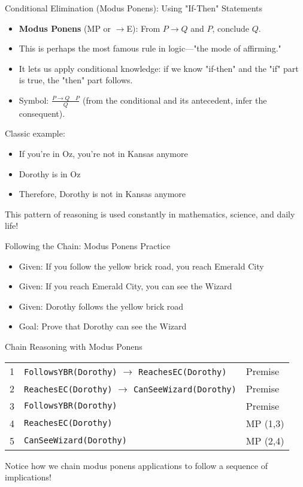 \documentclass{beamer}
\begin{document}
	\begin{frame}{Conditional Elimination (Modus Ponens): Using "If-Then" Statements}
		\begin{itemize}
			\item \textbf{Modus Ponens} (MP or $\rightarrow$E): From $P \rightarrow Q$ and $P$, conclude $Q$.
			\item This is perhaps the most famous rule in logic—"the mode of affirming."
			\item It lets us apply conditional knowledge: if we know "if-then" and the "if" part is true, the "then" part follows.
			\item Symbol: $\frac{P \rightarrow Q \quad P}{Q}$ (from the conditional and its antecedent, infer the consequent).
		\end{itemize}
		
		\begin{example}
			Classic example:
			\begin{itemize}
				\item If you're in Oz, you're not in Kansas anymore
				\item Dorothy is in Oz
				\item Therefore, Dorothy is not in Kansas anymore
			\end{itemize}
			This pattern of reasoning is used constantly in mathematics, science, and daily life!
		\end{example}
	\end{frame}
	
	\begin{frame}{Following the Chain: Modus Ponens Practice}
		\begin{itemize}
			\item Given: If you follow the yellow brick road, you reach Emerald City
			\item Given: If you reach Emerald City, you can see the Wizard
			\item Given: Dorothy follows the yellow brick road
			\item Goal: Prove that Dorothy can see the Wizard
		\end{itemize}
		
		\begin{block}{Chain Reasoning with Modus Ponens}
			\begin{tabular}{|c|l|l|}
				\hline
				1 & \texttt{FollowsYBR(Dorothy)} $\rightarrow$ \texttt{ReachesEC(Dorothy)} & Premise \\
				2 & \texttt{ReachesEC(Dorothy)} $\rightarrow$ \texttt{CanSeeWizard(Dorothy)} & Premise \\
				3 & \texttt{FollowsYBR(Dorothy)} & Premise \\
				4 & \texttt{ReachesEC(Dorothy)} & MP (1,3) \\
				5 & \texttt{CanSeeWizard(Dorothy)} & MP (2,4) \\
				\hline
			\end{tabular}
			
			Notice how we chain modus ponens applications to follow a sequence of implications!
		\end{block}
	\end{frame}
	
\end{document}
